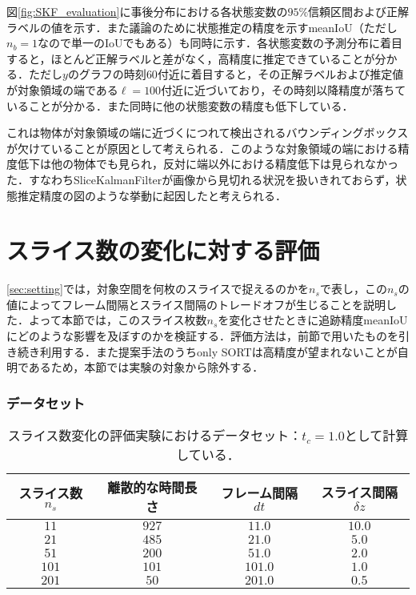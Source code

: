         図\ref{fig:SKF_evaluation}に事後分布における各状態変数の$95\%$信頼区間および正解ラベルの値を示す．また議論のために状態推定の精度を示すmeanIoU（ただし$n_b = 1$なので単一のIoUでもある）も同時に示す．各状態変数の予測分布に着目すると，ほとんど正解ラベルと差がなく，高精度に推定できていることが分かる．ただし$y$のグラフの時刻$60$付近に着目すると，その正解ラベルおよび推定値が対象領域の端である$\ell = 100$付近に近づいており，その時刻以降精度が落ちていることが分かる．また同時に他の状態変数の精度も低下している．

        これは物体が対象領域の端に近づくにつれて検出されるバウンディングボックスが欠けていることが原因として考えられる．このような対象領域の端における精度低下は他の物体でも見られ，反対に端以外における精度低下は見られなかった．すなわちSliceKalmanFilterが画像から見切れる状況を扱いきれておらず，状態推定精度の図のような挙動に起因したと考えられる．

\section{スライス数の変化に対する評価}
\label{sec:number_of_slice_effect}

\ref{sec:setting}では，対象空間を何枚のスライスで捉えるのかを$n_s$で表し，この$n_s$の値によってフレーム間隔とスライス間隔のトレードオフが生じることを説明した．よって本節では，このスライス枚数$n_s$を変化させたときに追跡精度meanIoUにどのような影響を及ぼすのかを検証する．評価方法は，前節で用いたものを引き続き利用する．また提案手法のうちonly SORTは高精度が望まれないことが自明であるため，本節では実験の対象から除外する．

    \subsubsection{データセット}

    \begin{table}[t]
        \centering
        \caption[スライス数変化の評価実験におけるデータセット]{スライス数変化の評価実験におけるデータセット：$t_c = 1.0$として計算している．}
        \label{tab:ns_exp_detail}
        \begin{tabular}{c|ccc}
            スライス数$n_s$ & 離散的な時間長さ & フレーム間隔$dt$ & スライス間隔$\delta z$ 
            \\ \hline \hline
            $11$ & $927$ & $11.0$ & $10.0$
            \\ $21$ & $485$ & $21.0$ & $5.0$
            \\ $51$ & $200$ & $51.0$ & $2.0$
            \\ $101$ & $101$ & $101.0$ & $1.0$
            \\ $201$ & $50$ & $201.0$ & $0.5$
        \end{tabular}
    \end{table}

